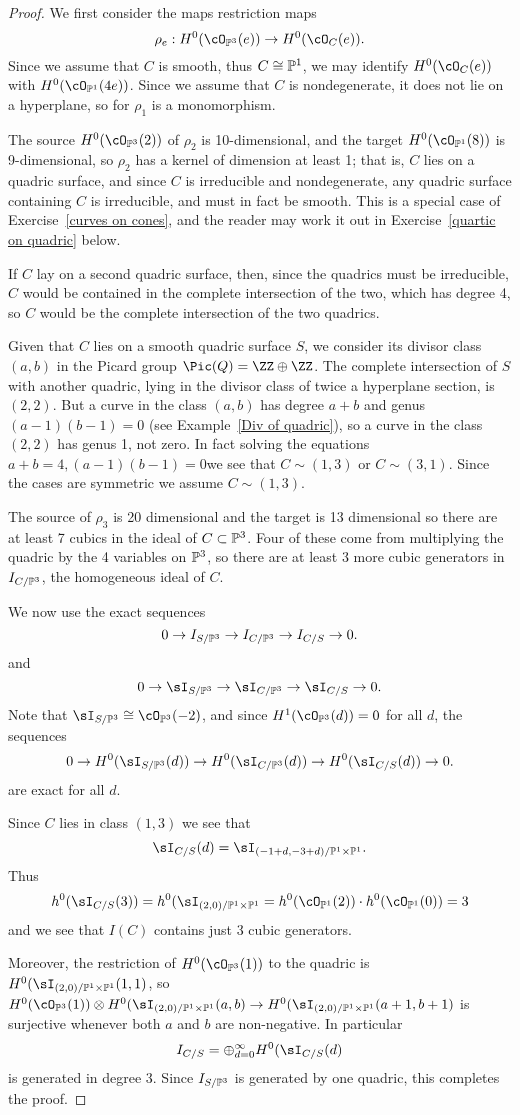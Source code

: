 \begin{proof}
We first consider the maps restriction maps
$$
\rho_e: H^0(\op3e) \to H^0(\cO_C(e)).
$$
Since we assume that $C$ is smooth, thus $C\cong \PP^1$,
we may identify $H^0(\cO_C(e))$ with $H^0(\op1{4e})$.
 Since we assume that $C$ is nondegenerate, it does not lie on a hyperplane,
 so for $\rho_1$ is a monomorphism. 
 
The source $H^0(\op32)$ of $\rho_2$ is 10-dimensional, and the target $H^0(\op18)$ is
9-dimensional, so $\rho_2$ has a kernel of dimension at least 1; that is, $C$ lies on
a quadric surface, and since $C$ is irreducible and nondegenerate, any quadric surface containing
$C$ is irreducible, and must in fact be smooth. This is a special case of 
Exercise~\ref{curves on cones}, and the reader may work it out in Exercise~\ref{quartic on quadric} below.

If $C$ lay on a second quadric surface, then, since the quadrics must be irreducible,
$C$ would be contained in the complete intersection of the two, which has degree 4, so 
$C$ would be the complete intersection of the two quadrics.

Given that $C$ lies on a smooth quadric surface $S$, we consider its divisor class $(a,b)$ in the 
Picard group $\Pic(Q) = \ZZ\oplus \ZZ$. The complete intersection of $S$ with another
quadric, lying in the divisor class of twice a hyperplane section, is $(2,2)$. But a curve
in the class $(a,b)$ has degree $a+b$ and genus $(a-1)(b-1) = 0$ (see Example~\ref{Div of quadric}), so a curve in the class $(2,2)$
has genus 1, not zero. In fact solving the equations $a+b=4, (a-1)(b-1)=0$we see that $C\sim (1,3)$ or $C\sim (3,1)$. Since the cases
are symmetric we assume $C\sim(1,3)$. 

The source of $\rho_3$ is 20 dimensional and the target is 13 dimensional so there are at least 7
cubics in the ideal of $C\subset \PP^3$. Four of these come from multiplying the quadric
by the 4 variables on $\PP^3$, so there are at least 3 more cubic generators in $I_{C/\PP^3}$,
 the homogeneous ideal of $C$. 

We now use the exact sequences 
$$
0\to I_{S/\PP^3} \to I_{C/\PP^3} \to I_{C/S} \to 0.
$$
and
$$
0\to \sI_{S/\PP^3} \to \sI_{C/\PP^3} \to \sI_{C/S} \to 0.
$$
Note that $\sI_{S/\PP^3} \cong \op3{-2}$, and since $H^1(\op3d)=0$ for all $d$, 
the sequences
$$
0\to H^0(\sI_{S/\PP^3}(d)) \to H^0(\sI_{C/\PP^3}(d)) \to H^0(\sI_{C/S}(d)) \to 0.
$$
are exact for all $d$. 

Since $C$ lies in class $(1,3)$ we see that 
$$
\sI_{C/S}(d) = \sI_{(-1+d,-3+d)/\PP^1\times \PP^1}.
$$
Thus 
$$
h^0(\sI_{C/S}(3)) = h^0(\sI_{(2,0)/\PP^1\times \PP^1} = h^0(\op12)\cdot h^0(\op10) = 3
$$
and we see that $I(C)$ contains just 3 cubic generators. 

Moreover, the restriction
of $H^0(\op31)$ to the quadric is $H^0(\sI_{(2,0)/\PP^1\times \PP^1}(1,1)$,
so $H^0(\op31) \otimes H^0(\sI_{(2,0)/\PP^1\times \PP^1}(a,b) \to 
H^0(\sI_{(2,0)/\PP^1\times \PP^1}(a+1, b+1)$
is surjective whenever both $a$ and $b$ are non-negative. In particular
$$
I_{C/S} = \oplus_{d=0}^\infty H^0(\sI_{C/S}(d)
$$
 is generated in degree 3. Since $I_{S/\PP^3}$ is generated by one quadric, this
  completes the proof.
\end{proof}


